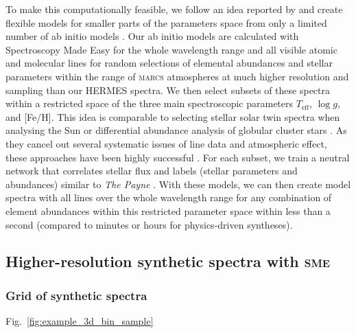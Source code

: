 \documentclass[
  journal=pasa,
  manuscript=research-paper, %
  year=2021,
  volume=37
]{cup-journal}
\newcommand{\Teff}{$T_\mathrm{eff}$\xspace}
\newcommand{\logg}{$\log g$\xspace}
\newcommand{\sme}{\textsc{sme}\xspace}
\begin{document}
To make this computationally feasible, we follow an idea reported by \citet{Rix2016} and create flexible models for smaller parts of the parameters space from only a limited number of ab initio models \citep[see also][]{Ting2016b}. Our ab initio models are calculated with Spectroscopy Made Easy \citep[\textsc{sme}][]{Valenti1996,Piskunov2017} for the whole wavelength range and all visible atomic and molecular lines for random selections of elemental abundances and stellar parameters within the range of \textsc{marcs} atmospheres \citep{Gustafsson2008} at much higher resolution and sampling than our HERMES spectra. We then select subsets of these spectra within a restricted space of the three main spectroscopic parameters \Teff, \logg, and [Fe/H]. This idea is comparable to selecting stellar solar twin spectra when analysing the Sun \citep[see e.g.]{Nissen2015} or differential abundance analysis of globular cluster stars \citep[e.g.][and Monty et al. in prep]{Yong2013}. As they cancel out several systematic issues of line data and atmospheric effect, these approaches have been highly successful \citep{Nissen2018}. For each subset, we train a neutral network that correlates stellar flux and labels (stellar parameters and abundances) similar to \textit{The Payne} \citep{Ting2019}. With these models, we can then create model spectra with all lines over the whole wavelength range for any combination of element abundances within this restricted parameter space within less than a second (compared to minutes or hours for physics-driven syntheses). 

\subsection{Higher-resolution synthetic spectra with \sme}
\label{sec:higher_resolution_synthetic_spectra}

\subsubsection{Grid of synthetic spectra} \label{subsubsec:spectrum_grid}

Fig.~\ref{fig:example_3d_bin_sample}
\end{document}
